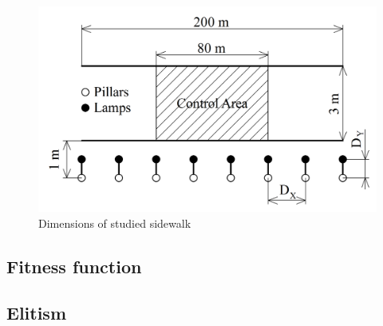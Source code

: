 \begin{figure}[htb]
  \centering
  \includegraphics[width=\columnwidth]{kotyChodniku}
  \caption{Dimensions of studied sidewalk}
  \label{fig:sidewalk}
\end{figure}

\subsection{Fitness function}
\subsection{Elitism}